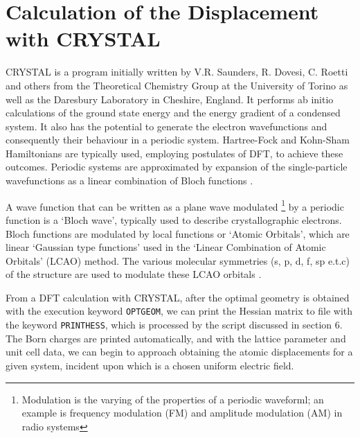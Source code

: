 \documentclass[10pt]{article}
\begin{document}
\section{Calculation of the Displacement with CRYSTAL}
CRYSTAL is a program initially written by V.R. Saunders, R. Dovesi, C. Roetti and others from the Theoretical Chemistry Group at the University of Torino as well as the Daresbury Laboratory in Cheshire, England. It performs ab initio calculations of the ground state energy and the energy gradient of a condensed system. It also has the potential to generate the electron wavefunctions and consequently their behaviour in a periodic system. Hartree-Fock and Kohn-Sham Hamiltonians are typically used, employing postulates of DFT, to achieve these outcomes. Periodic systems are approximated by expansion of the single-particle wavefunctions as a linear combination of Bloch functions \cite{dovesi2017crystal17}.

A wave function that can be written as a plane wave modulated \footnote{Modulation is the varying of the properties of a periodic waveforml; an example is frequency modulation (FM) and amplitude modulation (AM) in radio systems} by a periodic function is a `Bloch wave', typically used to describe crystallographic electrons. Bloch functions are modulated by local functions or `Atomic Orbitals', which are linear `Gaussian type functions' used in the `Linear Combination of Atomic Orbitals' (LCAO) method. The various molecular symmetries (s, p, d, f, sp e.t.c) of the structure are used to modulate these LCAO orbitals \cite{dovesi2017crystal17}.

From a DFT calculation with CRYSTAL, after the optimal geometry is obtained with the execution keyword \verb|OPTGEOM|, we can print the Hessian matrix to file with the keyword \verb|PRINTHESS|, which is processed by the script discussed in section 6. The Born charges are printed automatically, and with the lattice parameter and unit cell data, we can begin to approach obtaining the atomic displacements for a given system, incident upon which is a chosen uniform electric field.



\end{document}
